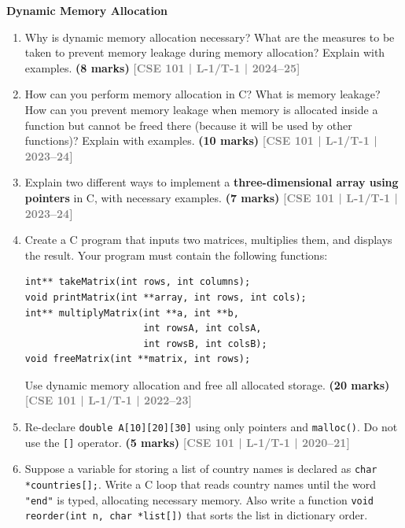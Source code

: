 \documentclass[12pt,a3paper]{article}
\newcommand{\yr}[1]{\hfill\textcolor{gray}{\small\textbf{[#1]}}}
\newcommand{\mk}[1]{\textcolor{orange!70!black}{\small\textbf{(#1 marks)}}}
\newcommand{\subtopic}[2]{%
  \vspace{10pt}
  \noindent\begin{tcolorbox}[colback=#1!8,colframe=#1,boxrule=0.6pt,arc=4pt,
    left=6pt,right=6pt,top=4pt,bottom=4pt]
    \small\bfseries\textcolor{#1}{#2}
  \end{tcolorbox}
  \vspace{2pt}
}
\begin{document}
\subtopic{cC}{Dynamic Memory Allocation}
\label{sub:s5-dynmem}

\begin{enumerate}

  \item Why is dynamic memory allocation necessary? What are the measures to be taken to prevent memory leakage during memory allocation? Explain with examples.
\mk{8} \yr{CSE 101 | L-1/T-1 | 2024--25}
  

\item How can you perform memory allocation in C? What is memory leakage? How can you prevent memory leakage when memory is allocated inside a function but cannot be freed there (because it will be used by other functions)? Explain with examples.
\mk{10} \yr{CSE 101 | L-1/T-1 | 2023--24}

\item Explain two different ways to implement a \textbf{three-dimensional array using pointers} in C, with necessary examples.
\mk{7} \yr{CSE 101 | L-1/T-1 | 2023--24}

\item Create a C program that inputs two matrices, multiplies them, and displays the result. Your program must contain the following functions:
\begin{lstlisting}
int** takeMatrix(int rows, int columns);
void printMatrix(int **array, int rows, int cols);
int** multiplyMatrix(int **a, int **b,
                     int rowsA, int colsA,
                     int rowsB, int colsB);
void freeMatrix(int **matrix, int rows);
\end{lstlisting}
Use dynamic memory allocation and free all allocated storage.
\mk{20} \yr{CSE 101 | L-1/T-1 | 2022--23}

\item Re-declare \texttt{double A[10][20][30]} using only pointers and \texttt{malloc()}. Do not use the \texttt{[]} operator.
\mk{5} \yr{CSE 101 | L-1/T-1 | 2020--21}

\item Suppose a variable for storing a list of country names is declared as \texttt{char *countries[];}. Write a C loop that reads country names until the word \texttt{"end"} is typed, allocating necessary memory. Also write a function \texttt{void reorder(int n, char *list[])} that sorts the list in dictionary order.
 

\end{enumerate}
\end{document}
